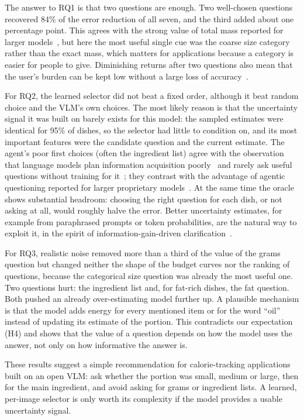 \documentclass[twocolumn]{svjour3}
\begin{document}
The answer to RQ1 is that two questions are enough. Two well-chosen questions recovered 84\% of the error
reduction of all seven, and the third added about one percentage point. This agrees with the strong value of
total mass reported for larger models~\cite{bhatambarekar2025thesis}, but here the most useful single cue
was the coarse size category rather than the exact mass, which matters for applications because a category
is easier for people to give. Diminishing returns after two questions also mean that the user's burden can
be kept low without a large loss of accuracy~\cite{hochsmann2020review}.

For RQ2, the learned selector did not beat a fixed order, although it beat random choice and the VLM's
own choices. The most likely reason is that the uncertainty signal it was built on barely exists for this
model: the sampled estimates were identical for 95\% of dishes, so the selector had little to condition on,
and its most important features were the candidate question and the current estimate. The agent's poor
first choices (often the ingredient list) agree with the observation that language models plan information
acquisition poorly~\cite{perets2026zeroshot} and rarely ask useful questions without training for
it~\cite{zhang2024clarifying}; they contrast with the advantage of agentic questioning reported for larger
proprietary models~\cite{bhatambarekar2026agentic}. At the same time the oracle shows substantial headroom:
choosing the right question for each dish, or not asking at all, would roughly halve the error. Better
uncertainty estimates, for example from paraphrased prompts or token probabilities, are the natural way to
exploit it, in the spirit of information-gain-driven
clarification~\cite{kobalczyk2025active,infogain2026clarification}.

For RQ3, realistic noise removed more than a third of the value of the grams question but changed
neither the shape of the budget curves nor the ranking of questions, because the categorical size question
was already the most useful one. Two questions hurt: the ingredient list and, for fat-rich dishes, the fat
question. Both pushed an already over-estimating model further up. A plausible mechanism is that the model
adds energy for every mentioned item or for the word ``oil'' instead of updating its estimate of the
portion. This contradicts our expectation (H4) and shows that the value of a question depends on how the
model uses the answer, not only on how informative the answer is.

These results suggest a simple recommendation for calorie-tracking applications built on an open VLM: ask
whether the portion was small, medium or large, then for the main ingredient, and avoid asking for grams
or ingredient lists. A learned, per-image selector is only worth its complexity if the model provides a
usable uncertainty signal.
\end{document}
